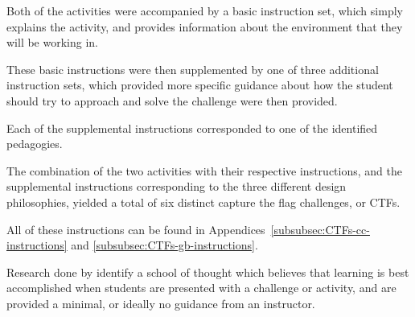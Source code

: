 






    Both of the activities were accompanied by a basic instruction set, which simply explains the activity, and provides information about the environment that they will be working in. %







These basic instructions were then supplemented by one of three additional instruction sets, which provided more specific guidance about how the student should try to approach and solve the challenge were then provided. %







Each of the supplemental instructions corresponded to one of the identified pedagogies. %







The combination of the two activities with their respective instructions, and the supplemental instructions corresponding to the three different design philosophies, yielded a total of six distinct capture the flag challenges, or CTFs. %







All of these instructions can be found in Appendices~\ref{subsubsec:CTFs-cc-instructions} and \ref{subsubsec:CTFs-gb-instructions}.






















        Research done by \textcite{J-Sweller,R-Weiss} identify a school of thought which believes that learning is best accomplished when students are presented with a challenge or activity, and are provided a minimal, or ideally no guidance from an instructor. %







